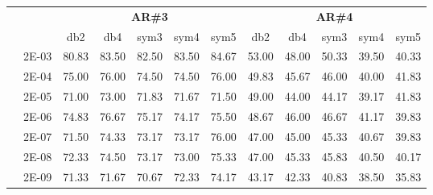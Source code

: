 \begin{table}[H]
\begin{tabular}{|c|c|c c c c c|c c c c c|}
\cline{3-12}
\multicolumn{2}{c}{} & \multicolumn{5}{|c|}{\textbf{AR\#3}}  & \multicolumn{5}{c|}{\textbf{AR\#4}} \\\cline{3-12}
\multicolumn{2}{c}{}  & \multicolumn{1}{|c}{db2} & db4 & sym3 & sym4 & sym5 & db2 & db4& sym3 & sym4 & sym5 \\\hline
\multicolumn{1}{|c|}{ \multirow{6}{*}{\rotatebox[origin=c]{90}{\textbf{Gamma}}} }
&2E-03&	80.83&	83.50&	82.50&	83.50&	84.67&	53.00&	48.00&	50.33&	39.50&	40.33	\\\cline{2-12}
&2E-04&	75.00&	76.00&	74.50&	74.50&	76.00&	49.83&	45.67&	46.00&	40.00&	41.83	\\\cline{2-12}
&2E-05&	71.00&	73.00&	71.83&	71.67&	71.50&	49.00&	44.00&	44.17&	39.17&	41.83	\\\cline{2-12}
&2E-06&	74.83&	76.67&	75.17&	74.17&	75.50&	48.67&	46.00&	46.67&	41.17&	39.83	\\\cline{2-12}
&2E-07&	71.50&	74.33&	73.17&	73.17&	76.00&	47.00&	45.00&	45.33&	40.67&	39.83	\\\cline{2-12}
&2E-08&	72.33&	74.50&	73.17&	73.00&	75.33&	47.00&	45.33&	45.83&	40.50&	40.17	\\\cline{2-12}
&2E-09&	71.33&	71.67&	70.67&	72.33&	74.17&	43.17&	42.33&	40.83&	38.50&	35.83	
	
	
	
	
\\\midrule
\end{tabular}

\end{table}



